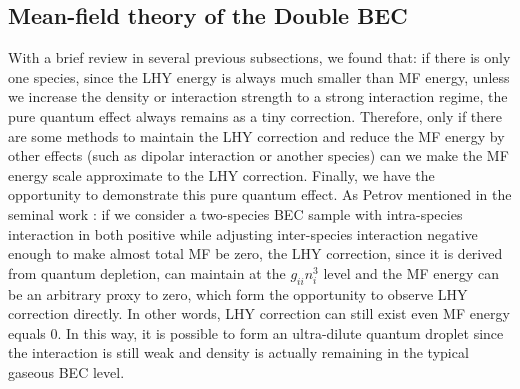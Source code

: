 \subsection{Mean-field theory of the Double BEC}

With a brief review in several previous subsections, we found that: if there is only one species, since the LHY energy is always much smaller than MF energy, unless we increase the density or interaction strength to a strong interaction regime, the pure quantum effect always remains as a tiny correction. Therefore, only if there are some methods to maintain the LHY correction and reduce the MF energy by other effects (such as dipolar interaction or another species) can we make the MF energy scale approximate to the LHY correction. Finally, we have the opportunity to demonstrate this pure quantum effect. As Petrov mentioned in the seminal work \cite{petrov2015}: if we consider a two-species BEC sample with intra-species interaction in both positive while adjusting inter-species interaction negative enough to make almost total MF be zero, the LHY correction, since it is derived from quantum depletion, can maintain at the $g_{ii} n_i^3$ level and the MF energy can be an arbitrary proxy to zero, which form the opportunity to observe LHY correction directly. In other words, LHY correction can still exist even MF energy equals 0. In this way, it is possible to form an ultra-dilute quantum droplet since the interaction is still weak and density is actually remaining in the typical gaseous BEC level.

